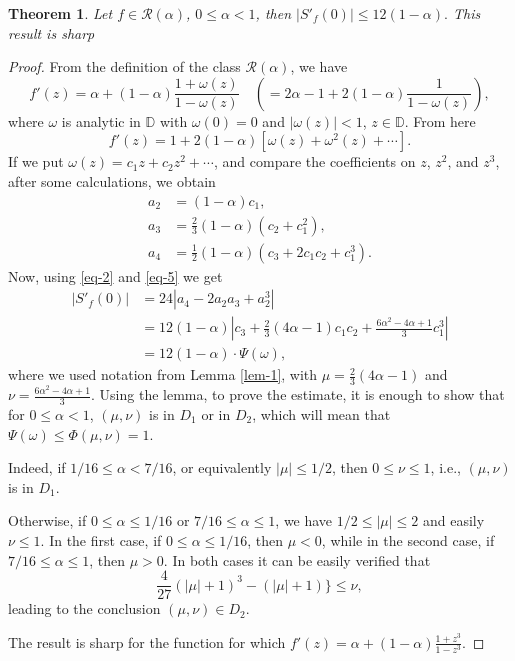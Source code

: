 \documentclass{amsart}
\newtheorem{thm}{Theorem}
\newcommand{\ID}{{\mathbb D}}
\def\be{\begin{equation}}
\def\ee{\end{equation}}
\begin{document}
\begin{thm}\label{th1}
Let $f\in\mathcal{R}(\alpha)$, $0\leq \alpha<1$, then $|S'_{f}(0)|\leq 12(1-\alpha).$
This result is sharp
\end{thm}
\begin{proof}
From the definition of the class $\mathcal{R}(\alpha)$, we have
\[
f'(z)=\alpha +(1-\alpha)\frac{1+\omega(z)}{1-\omega(z)} \quad \left( =2\alpha -1+2(1-\alpha)\frac{1}{1-\omega(z)}\right),
\]
where $\omega$ is analytic in $\ID$ with $\omega(0)=0$ and $|\omega(z)|<1$, $z\in\ID$. From here
\[
f'(z)= 1+2(1-\alpha)\left[\omega(z)+\omega^{2}(z)+\cdots\right].
\]
If we put $\omega(z)=c_{1}z+c_{2}z^{2}+\cdots$, and compare the coefficients on $z$, $z^{2}$, and $z^{3}$, after some calculations, we obtain
\be\label{eq-5}
\begin{split}
a_{2}&=(1-\alpha)c_{1}, \\
a_{3}&=\frac{2}{3}(1-\alpha)\left(c_{2}+c_{1}^{2}\right),\\
a_{4}&=\frac{1}{2}(1-\alpha)\left(c_{3}+2 c_{1}c_{2}+ c_{1}^{3}\right).
\end{split}
\ee
Now, using \eqref{eq-2} and \eqref{eq-5} we get
\[
\begin{split}
|S'_{f}(0)|&=24|a_{4}-2a_{2}a_{3}+a_{2}^{3}|\\
&=12(1-\alpha)\left|c_{3}+\frac{2}{3}(4\alpha-1)c_{1}c_{2}+\frac{6\alpha^{2}-4\alpha+1}{3}c_{1}^{3}\right|\\
&=12(1-\alpha)\cdot \Psi(\omega),
\end{split}
\]
where we used notation from Lemma \ref{lem-1}, with $\mu = \frac{2}{3}(4\alpha-1)$ and $\nu = \frac{6\alpha^{2}-4\alpha+1}{3}$.
Using the lemma, to prove the estimate, it is enough to show that for $0\le\alpha<1$, $(\mu,\nu)$ is in $D_1$ or in $D_2$, which will mean that $\Psi(\omega)\le \Phi(\mu,\nu)=1$.

\medskip

Indeed, if $1/16\le\alpha<7/16$, or equivalently $|\mu|\le1/2$, then $0\le\nu\le1$, i.e., $(\mu,\nu)$ is in $D_1$.

\medskip

Otherwise, if $0\le\alpha\le1/16$ or $7/16\le\alpha\le1$, we have $1/2\le|\mu|\le2$ and easily $\nu\le1$.
In the first case, if $0\le\alpha\le1/16$, then $\mu<0$, while in the second case, if $7/16\le\alpha\le1$, then $\mu>0$. In both cases it can be easily verified that
\[ \frac{4}{27}(|\mu|+1)^{3}-(|\mu|+1)\}\leq\nu,\]
leading to the conclusion  $(\mu,\nu)\in D_2$.

\medskip

The result is sharp for the function for which $f'(z)=\alpha +(1-\alpha)\frac{1+z^{3}}{1-z^{3}}.$
\end{proof}
\end{document}

